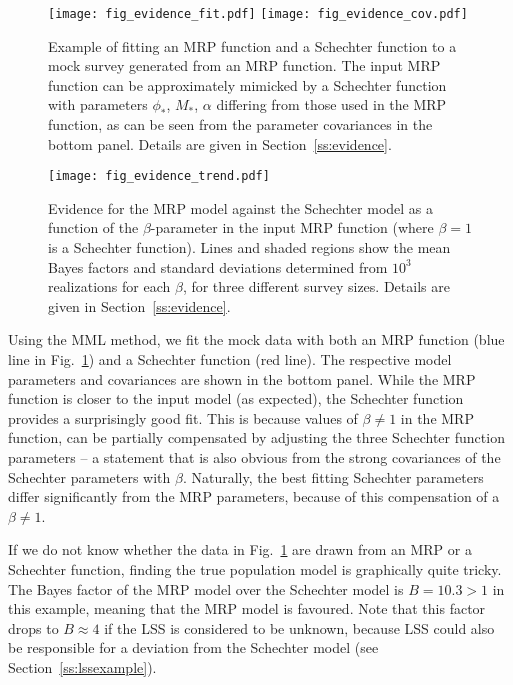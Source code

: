 \documentclass[a4paper,fleqn,usenatbib]{mnras}
\newcommand{\fig}[1]{Fig.~\ref{fig:#1}}
\renewcommand{\ss}[1]{Section~\ref{ss:#1}}
\begin{document}
\begin{figure}
\begin{center}
\texttt{[image: fig\_evidence\_fit.pdf]}\vspace{0.1cm}
\texttt{[image: fig\_evidence\_cov.pdf]}\vspace{0.6cm}
\caption{Example of fitting an MRP function and a Schechter function to a mock survey generated from an MRP function. The input MRP function can be approximately mimicked by a Schechter function with parameters $\phi_\ast$, $M_\ast$, $\alpha$ differing from those used in the MRP function, as can be seen from the parameter covariances in the bottom panel. Details are given in \ss{evidence}.}\label{fig:mrpfit}
\end{center}
\end{figure}

\begin{figure}
\begin{center}
\texttt{[image: fig\_evidence\_trend.pdf]}\vspace{0.1cm}
\caption{Evidence for the MRP model against the Schechter model as a function of the $\beta$-parameter in the input MRP function (where $\beta=1$ is a Schechter function). Lines and shaded regions show the mean Bayes factors and standard deviations determined from $10^3$ realizations for each $\beta$, for three different survey sizes. Details are given in \ss{evidence}.}\label{fig:mrpevidence}
\end{center}
\end{figure}

Using the MML method, we fit the mock data with both an MRP function (blue line in \fig{mrpfit}) and a Schechter function (red line). The respective model parameters and covariances are shown in the bottom panel. While the MRP function is closer to the input model (as expected), the Schechter function provides a surprisingly good fit. This is because values of $\beta\neq1$ in the MRP function, can be partially compensated by adjusting the three Schechter function parameters -- a statement that is also obvious from the strong covariances of the Schechter parameters with $\beta$. Naturally, the best fitting Schechter parameters differ significantly from the MRP parameters, because of this compensation of a $\beta\neq1$.

If we do not know whether the data in \fig{mrpfit} are drawn from an MRP or a Schechter function, finding the true population model is graphically quite tricky. The Bayes factor of the MRP model over the Schechter model is $B=10.3>1$ in this example, meaning that the MRP model is favoured. Note that this factor drops to $B\approx4$ if the LSS is considered to be unknown, because LSS could also be responsible for a deviation from the Schechter model (see \ss{lssexample}).
\end{document}
